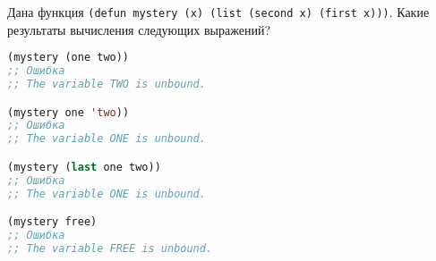 Дана функция \verb|(defun mystery (x) (list (second x) (first x)))|. Какие
результаты вычисления следующих выражений?

\begin{lstlisting}[language=Lisp]
(mystery (one two))
;; Ошибка
;; The variable TWO is unbound.

(mystery one 'two))
;; Ошибка
;; The variable ONE is unbound.

(mystery (last one two))
;; Ошибка
;; The variable ONE is unbound.

(mystery free)
;; Ошибка
;; The variable FREE is unbound.
\end{lstlisting}

